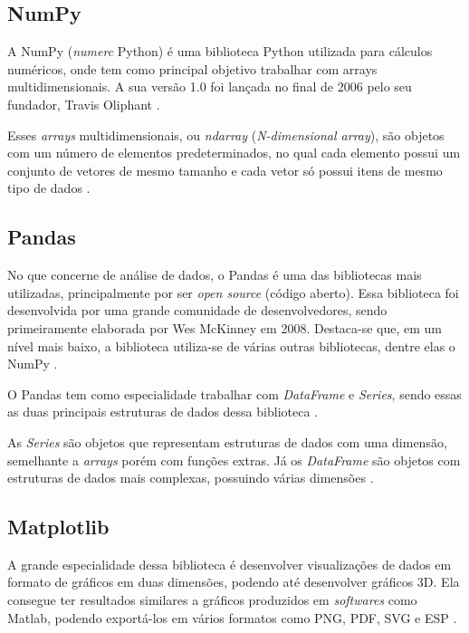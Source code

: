 \subsection{NumPy}

A NumPy (\textit{numerc} Python) é uma biblioteca Python utilizada para cálculos numéricos, onde tem como principal objetivo trabalhar com arrays multidimensionais. A sua versão 1.0 foi lançada no final de 2006 pelo seu fundador, Travis Oliphant \cite{ref:oliphant_2006}.

Esses \textit{arrays} multidimensionais, ou \textit{ndarray} (\textit{N-dimensional array}), são objetos com um número de elementos predeterminados, no qual cada elemento possui um conjunto de vetores de mesmo tamanho e cada vetor só possui itens de mesmo tipo de dados \cite{ref:nelli_2023}.

\subsection{Pandas}

No que concerne de análise de dados, o Pandas é uma das bibliotecas mais utilizadas, principalmente por ser \textit{open source} (código aberto). Essa biblioteca foi desenvolvida por uma grande comunidade de desenvolvedores, sendo primeiramente elaborada por Wes McKinney em 2008.  Destaca-se que, em um nível mais baixo, a biblioteca utiliza-se de várias outras bibliotecas, dentre elas o NumPy \cite{ref:mckinney_2022}.

O Pandas tem como especialidade trabalhar com \textit{DataFrame} e \textit{Series}, sendo essas as duas principais estruturas de dados dessa biblioteca \cite{ref:nelli_2023}.

As \textit{Series} são objetos que representam estruturas de dados com uma dimensão, semelhante a \textit{arrays} porém com funções extras. Já os \textit{DataFrame} são objetos com estruturas de dados mais complexas, possuindo várias dimensões \cite{ref:nelli_2023}.

\subsection{Matplotlib}

A grande especialidade dessa biblioteca é desenvolver visualizações de dados em formato de gráficos em duas dimensões, podendo até desenvolver gráficos 3D. Ela consegue ter resultados similares a gráficos produzidos em \textit{softwares} como Matlab, podendo exportá-los em vários formatos como PNG, PDF, SVG e ESP \cite{ref:nelli_2023}.

